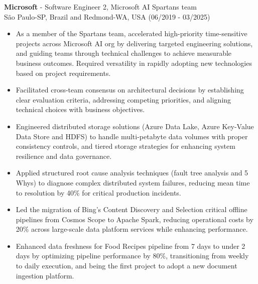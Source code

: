 
\normalsize{\textbf{Microsoft} - Software Engineer 2, Microsoft AI Spartans team}\\
    \footnotesize{São Paulo-SP, Brazil and Redmond-WA, USA (06/2019 - 03/2025)}

\begin{itemize}
    \item \small{As a member of the Spartans team, accelerated high-priority time-sensitive
        projects across Microsoft AI org by delivering targeted engineering solutions, and guiding teams
        through technical challenges to achieve measurable business outcomes. Required versatility 
        in rapidly adopting new technologies based on project requirements.}

    \item \small{Facilitated cross-team consensus on architectural decisions by establishing clear 
        evaluation criteria, addressing competing priorities, and aligning technical choices with 
        business objectives.}

    \item \small{Engineered distributed storage solutions (Azure Data Lake, Azure Key-Value Data Store 
        and HDFS) to handle multi-petabyte data volumes with proper consistency controls, and tiered
        storage strategies for enhancing system resilience and data governance.}

    \item \small{Applied structured root cause analysis techniques (fault tree analysis and 5
        Whys) to diagnose complex distributed system failures, reducing mean time to resolution by 40\%
        for critical production incidents.}

    \item \small{Led the migration of Bing's Content Discovery and Selection critical offline
        pipelines from Cosmos Scope to Apache Spark, reducing operational costs by 20\% across
        large-scale data platform services while enhancing performance.}

    \item \small{Enhanced data freshness for Food Recipes pipeline from 7 days to under 2 days by
        optimizing pipeline performance by 80\%, transitioning from weekly to daily execution, and being 
        the first project to adopt a new document ingestion platform.}


\end{itemize}
